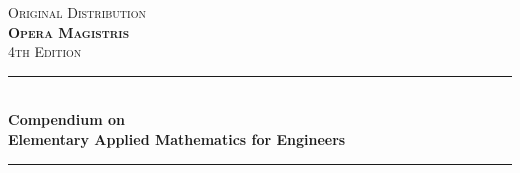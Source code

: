 \documentclass[12pt,a4paper,twoside,openright]{report}
\theoremstyle{definition}
\theoremstyle{itexmp}
\numberwithin{equation}{section}
\begin{document}
    
	\begin{titlepage}

\newcommand{\HRule}{\rule{\linewidth}{0.5mm}} %

\center %
 

\textsc{\Large Original Distribution}\\[1.5cm] %
\textsc{\Huge \textbf{Opera Magistris}}\\[0.5cm] %
\textsc{\large 4th Edition}\\[0.5cm] %


\HRule \\[0.4cm]
{ \Large \bfseries Compendium on \\ Elementary Applied Mathematics for Engineers }\\[0.4cm] %
\HRule \\[1.5cm]
 



\end{titlepage}
\end{document}
